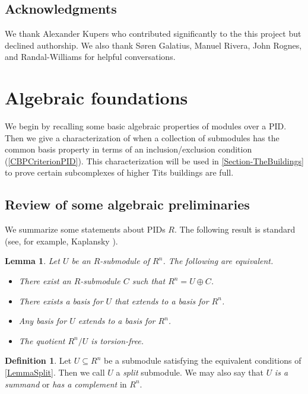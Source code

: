 \documentclass[a4paper]{amsart}
\numberwithin{theoremcounter}{section}
\newtheorem{lemma}[lemmaauto]{Lemma}
\theoremstyle{definition}
\newtheorem{definition}[Defauto]{Definition}
\theoremstyle{remark}
\begin{document}
\subsection{Acknowledgments} We thank Alexander Kupers who contributed significantly to the this project but declined authorship. We also thank Søren Galatius, Manuel Rivera, John Rognes, and Randal-Williams for helpful conversations.



\section{Algebraic foundations} 

We begin by recalling some basic algebraic properties of modules over a PID. Then we give a characterization of when a collection of submodules has the common basis property in terms of an inclusion/exclusion condition (\autoref{CBPCriterionPID}). This characterization will be used in \autoref{Section-TheBuildings} to prove certain subcomplexes of higher Tits buildings are full. 

\subsection{Review of some algebraic preliminaries}

We summarize some statements about PIDs $R$. The following result is standard (see, for example, Kaplansky \cite{Kaplansky}). 


\begin{lemma}  \label{LemmaSplit} Let $U$ be an $R$-submodule of $R^n$. The following are equivalent. 
\begin{itemize}
\item There exist an $R$-submodule $C$ such that $R^n = U \oplus C$. 
\item There exists a basis for $U$ that extends to a basis for $R^n$. 
\item Any basis for $U$ extends to a basis for $R^n$. 
\item The quotient $R^n/U$ is torsion-free. 
\end{itemize} 
\end{lemma}

\begin{definition}
Let $U \subseteq R^n$ be a submodule satisfying the equivalent conditions of \autoref{LemmaSplit}. Then we call $U$ a \emph{split} submodule. We may also say that $U$ \emph{is  a  summand} or \emph{has a complement} in $R^n$.  
\end{definition} 
\end{document}
